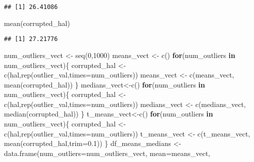 \documentclass[
]{article}
\newenvironment{Shaded}{\begin{snugshade}}{\end{snugshade}}
\newcommand{\AttributeTok}[1]{\textcolor[rgb]{0.77,0.63,0.00}{#1}}
\newcommand{\ControlFlowTok}[1]{\textcolor[rgb]{0.13,0.29,0.53}{\textbf{#1}}}
\newcommand{\DecValTok}[1]{\textcolor[rgb]{0.00,0.00,0.81}{#1}}
\newcommand{\FloatTok}[1]{\textcolor[rgb]{0.00,0.00,0.81}{#1}}
\newcommand{\FunctionTok}[1]{\textcolor[rgb]{0.00,0.00,0.00}{#1}}
\newcommand{\NormalTok}[1]{#1}
\newcommand{\OtherTok}[1]{\textcolor[rgb]{0.56,0.35,0.01}{#1}}
\begin{document}
\begin{verbatim}
## [1] 26.41086
\end{verbatim}

\begin{Shaded}
\begin{Highlighting}[]
\FunctionTok{mean}\NormalTok{(corrupted\_hal)}
\end{Highlighting}
\end{Shaded}

\begin{verbatim}
## [1] 27.21776
\end{verbatim}

\begin{Shaded}
\begin{Highlighting}[]
\NormalTok{num\_outliers\_vect }\OtherTok{\textless{}{-}} \FunctionTok{seq}\NormalTok{(}\DecValTok{0}\NormalTok{,}\DecValTok{1000}\NormalTok{)}
\NormalTok{means\_vect }\OtherTok{\textless{}{-}} \FunctionTok{c}\NormalTok{()}
\ControlFlowTok{for}\NormalTok{(num\_outliers }\ControlFlowTok{in}\NormalTok{ num\_outliers\_vect)\{}
\NormalTok{corrupted\_hal }\OtherTok{\textless{}{-}} \FunctionTok{c}\NormalTok{(hal,}\FunctionTok{rep}\NormalTok{(outlier\_val,}\AttributeTok{times=}\NormalTok{num\_outliers))}
\NormalTok{means\_vect }\OtherTok{\textless{}{-}} \FunctionTok{c}\NormalTok{(means\_vect, }\FunctionTok{mean}\NormalTok{(corrupted\_hal))}
\NormalTok{\}}
\NormalTok{medians\_vect}\OtherTok{\textless{}{-}}\FunctionTok{c}\NormalTok{()}
\ControlFlowTok{for}\NormalTok{(num\_outliers }\ControlFlowTok{in}\NormalTok{ num\_outliers\_vect)\{}
\NormalTok{corrupted\_hal }\OtherTok{\textless{}{-}} \FunctionTok{c}\NormalTok{(hal,}\FunctionTok{rep}\NormalTok{(outlier\_val,}\AttributeTok{times=}\NormalTok{num\_outliers))}
\NormalTok{medians\_vect }\OtherTok{\textless{}{-}} \FunctionTok{c}\NormalTok{(medians\_vect, }\FunctionTok{median}\NormalTok{(corrupted\_hal))}
\NormalTok{\}}
\NormalTok{t\_means\_vect}\OtherTok{\textless{}{-}}\FunctionTok{c}\NormalTok{()}
\ControlFlowTok{for}\NormalTok{(num\_outliers }\ControlFlowTok{in}\NormalTok{ num\_outliers\_vect)\{}
\NormalTok{corrupted\_hal }\OtherTok{\textless{}{-}} \FunctionTok{c}\NormalTok{(hal,}\FunctionTok{rep}\NormalTok{(outlier\_val,}\AttributeTok{times=}\NormalTok{num\_outliers))}
\NormalTok{t\_means\_vect }\OtherTok{\textless{}{-}} \FunctionTok{c}\NormalTok{(t\_means\_vect, }\FunctionTok{mean}\NormalTok{(corrupted\_hal,}\AttributeTok{trim=}\FloatTok{0.1}\NormalTok{))}
\NormalTok{\}}
\NormalTok{df\_means\_medians }\OtherTok{\textless{}{-}} \FunctionTok{data.frame}\NormalTok{(}\AttributeTok{num\_outliers=}\NormalTok{num\_outliers\_vect, }\AttributeTok{mean=}\NormalTok{means\_vect,}

\end{Highlighting}
\end{Shaded}
\end{document}
